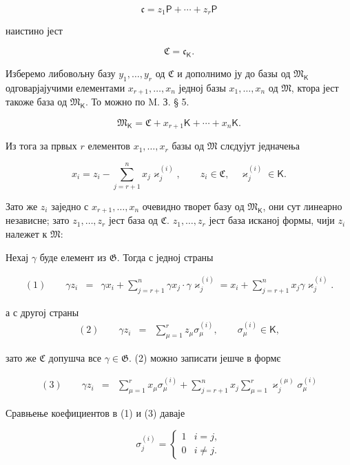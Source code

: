 \documentclass[11pt]{article}
\begin{document}
\[
\mathfrak c=z_1\mathsf P+\cdots+z_r\mathsf P
\]

наистино јест

\[
\mathfrak C=\mathfrak c_{\mathsf K}.
\]

Изберемо либовољну базу \(y_1,\ldots,y_r\) од \(\mathfrak C\) и дополнимо ју до базы од \(\mathfrak M_{\mathsf K}\) одговарјајучими елементами \(x_{r+1},\ldots,x_n\) једној базы \(x_1,\ldots,x_n\) од \(\mathfrak M\), ктора јест такоже база од \(\mathfrak M_{\mathsf K}\). То можно по M. З. § 5.

\[
\mathfrak M_{\mathsf K}=\mathfrak C+x_{r+1}\mathsf K+\cdots+x_n\mathsf K.
\]

Из тога за првых \(r\) елементов \(x_1,\ldots,x_r\) базы од \(\mathfrak M\) слєдујут једначења

\[
x_i=z_i-\sum_{j=r+1}^{n}x_j\varkappa_j^{(i)},\qquad
z_i\in\mathfrak C,\quad \varkappa_j^{(i)}\in\mathsf K.
\]

Зато же \(z_i\) заједно с \(x_{r+1},\ldots,x_n\) очевидно творет базу од \(\mathfrak M_{\mathsf K}\), они сут линеарно независне; зато \(z_1,\ldots,z_r\) јест база од \(\mathfrak C\). \(z_1,\ldots,z_r\) јест база исканој формы, чији \(z_i\) належет к \(\mathfrak M\):

Нехај \(\gamma\) буде елемент из \(\mathfrak G\). Тогда с једној страны

\[
\begin{array}{rcl}
(1)\qquad \gamma z_i
&=&\gamma x_i+\displaystyle\sum_{j=r+1}^{n}\gamma x_j\cdot \gamma\varkappa_j^{(i)}
=x_i+\displaystyle\sum_{j=r+1}^{n}x_j\gamma\varkappa_j^{(i)}.
\end{array}
\]

а с другој страны
\[
\begin{array}{rcl}
(2)\qquad \gamma z_i&=&\displaystyle\sum_{\mu=1}^{r}z_\mu\sigma_\mu^{(i)},
\qquad \sigma_\mu^{(i)}\in\mathsf K,
\end{array}
\]

зато же \(\mathfrak C\) допушча все \(\gamma\in\mathfrak G\). (2) можно записати јешче в формє

\[
\begin{array}{rcl}
(3)\qquad \gamma z_i
&=&\displaystyle\sum_{\mu=1}^{r}x_\mu\sigma_\mu^{(i)}
+\displaystyle\sum_{j=r+1}^{n}x_j\sum_{\mu=1}^{r}\varkappa_j^{(\mu)}\sigma_\mu^{(i)}
\end{array}
\]

Сравњење коефициентов в (1) и (3) даваје

\[
\sigma_j^{(i)}=
\begin{cases}
1 & i=j,\\
0 & i\ne j.
\end{cases}
\]
\end{document}

